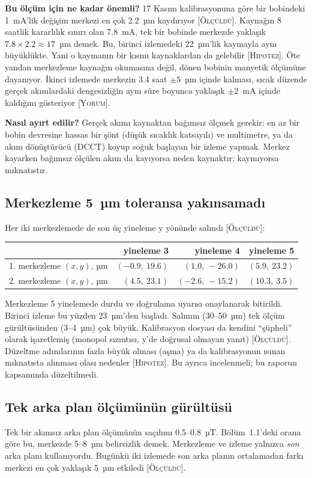 \documentclass[11pt,a4paper]{article}
\newcommand{\olc}{\textsc{[Ölçüldü]}}
\newcommand{\yor}{\textsc{[Yorum]}}
\newcommand{\hip}{\textsc{[Hipotez]}}
\begin{document}
\textbf{Bu ölçüm için ne kadar önemli?} 17 Kasım kalibrasyonuna göre bir bobindeki 1~mA'lik değişim merkezi
en çok 2.2~µm kaydırıyor \olc. Kaynağın 8 saatlik kararlılık sınırı olan 7.8~mA, tek bir bobinde merkezde
yaklaşık $7.8 \times 2.2 \approx 17$~µm demek. Bu, birinci izlemedeki 22~µm'lik kaymayla aynı büyüklükte.
Yani o kaymanın bir kısmı kaynaklardan da gelebilir \hip. Öte yandan merkezleme kaynağın okumasına değil,
dönen bobinin manyetik ölçümüne dayanıyor. İkinci izlemede merkezin 3.4 saat $\pm 5$~µm içinde kalması,
sıcak düzende gerçek akımlardaki dengesizliğin aynı süre boyunca yaklaşık $\pm 2$~mA içinde kaldığını
gösteriyor \yor.

\textbf{Nasıl ayırt edilir?} Gerçek akımı kaynaktan bağımsız ölçmek gerekir: en az bir bobin devresine hassas
bir şönt (düşük sıcaklık katsayılı) ve multimetre, ya da akım dönüştürücü (DCCT) koyup soğuk başlayan bir
izleme yapmak. Merkez kayarken bağımsız ölçülen akım da kayıyorsa neden kaynaktır; kaymıyorsa mıknatıstır.

\subsection{Merkezleme 5~µm toleransa yakınsamadı}
\label{sec:yakinsama}
Her iki merkezlemede de son üç yineleme y yönünde salındı \olc:
\begin{center}\small
\begin{tabular}{lrrr}
\toprule
 & yineleme 3 & yineleme 4 & yineleme 5 \\
\midrule
1. merkezleme $(x, y)$, µm & $(-0.9,\ 19.6)$ & $(1.0,\ -26.0)$ & $(5.9,\ 23.2)$ \\
2. merkezleme $(x, y)$, µm & $(4.5,\ 23.1)$ & $(-2.6,\ -15.2)$ & $(10.3,\ 3.5)$ \\
\bottomrule
\end{tabular}
\end{center}
Merkezleme 5 yinelemede durdu ve doğrulama uyarısı onaylanarak bitirildi. Birinci izleme bu yüzden 23~µm'den
başladı. Salınım (30--50~µm) tek ölçüm gürültüsünden (3--4~µm) çok büyük. Kalibrasyon dosyası da kendini
``şüpheli'' olarak işaretlemiş (monopol sızıntısı, y'de doğrusal olmayan yanıt) \olc. Düzeltme adımlarının
fazla büyük olması (aşma) ya da kalibrasyonun ısınan mıknatısta alınması olası nedenler \hip. Bu ayrıca
incelenmeli; bu raporun kapsamında düzeltilmedi.

\subsection{Tek arka plan ölçümünün gürültüsü}
Tek bir akımsız arka plan ölçümünün saçılımı 0.5--0.8~µT. Bölüm~1.1'deki orana göre bu, merkezde 5--8~µm
belirsizlik demek. Merkezleme ve izleme yalnızca \emph{son} arka planı kullanıyordu. Bugünkü iki izlemede son
arka planın ortalamadan farkı merkezi en çok yaklaşık 5~µm etkiledi \olc.
\end{document}
